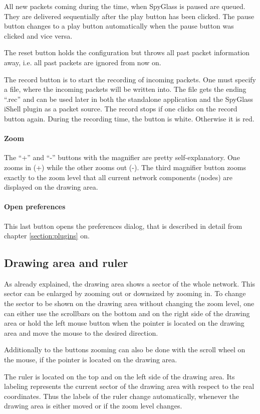 All new packets coming during the time, when SpyGlass is paused are queued. They are delivered sequentially after the
play button has been clicked. The pause button changes to a play button automatically when the pause button was clicked
and vice versa.

The reset button holds the configuration but throws all past packet information away, i.e. all past packets are ignored from
now on.

The record button is to start the recording of incoming packets. One must specify a file, where the incoming packets will be
written into. The file gets the ending ``.rec'' and can be used later in both the standalone application and the
SpyGlass iShell plugin as a packet source. The record stops if one clicks on the record button again. During the recording
time, the button is white. Otherwise it is red.

\paragraph{Zoom}

The ``+'' and ``-'' buttons with the magnifier are pretty self-explanatory. One zooms in (+) while the other zooms out (-).
The third magnifier button zooms exactly to the zoom level that all current network components (nodes) are displayed on the
drawing area.

\paragraph{Open preferences}

This last button opens the preferences dialog, that is described in detail from chapter \ref{section:plugins} on.


\subsection{Drawing area and ruler}

As already explained, the drawing area shows a sector of the whole network. This sector can be enlarged by zooming out
or downsized by zooming in. To change the sector to be shown on the drawing area without changing the zoom level,
one can either use the scrollbars
on the bottom and on the right side of the drawing area or hold the left mouse button when the pointer is located on the
drawing area and move the mouse to the desired direction.

Additionally to the buttons zooming can also be done with the scroll wheel on the mouse, if the pointer is located
on the drawing area.

The ruler is located on the top and on the left side of the drawing area. Its labeling represents the current sector
of the drawing area with respect to the real coordinates. Thus the labels of the ruler change automatically,
whenever the drawing area is either moved or if the zoom level changes.